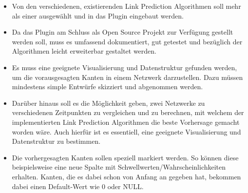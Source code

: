 \begin{itemize}
    \item Von den verschiedenen, existierenden Link Prediction Algorithmen soll mehr als einer ausgewählt und in das Plugin eingebaut werden.
    \item Da das Plugin am Schluss als Open Source Projekt zur Verfügung gestellt werden soll, muss es umfassend dokumentiert, gut getestet und bezüglich der Algorithmen leicht erweiterbar gestaltet werden.
    \item Es muss eine geeignete Visualisierung und Datenstruktur gefunden werden, um die vorausgesagten Kanten in einem Netzwerk darzustellen. Dazu müssen mindestens simple Entwürfe skizziert und abgenommen werden.
    \item Darüber hinaus soll es die Möglichkeit geben, zwei Netzwerke zu verschiedenen Zeitpunkten zu vergleichen und zu berechnen, mit welchem der implementierten Link Prediction Algorithmen die beste Vorhersage gemacht worden wäre. Auch hierfür ist es essentiell, eine geeignete Visualisierung und Datenstruktur zu bestimmen.
    \item Die vorhergesagten Kanten sollen speziell markiert werden. So können diese beispielsweise eine neue Spalte mit Schwellwerten/Wahrscheinlichkeiten erhalten. Kanten, die es dabei schon von Anfang an gegeben hat, bekommen dabei einen Default-Wert wie 0 oder NULL.
\end{itemize}

\newpage



